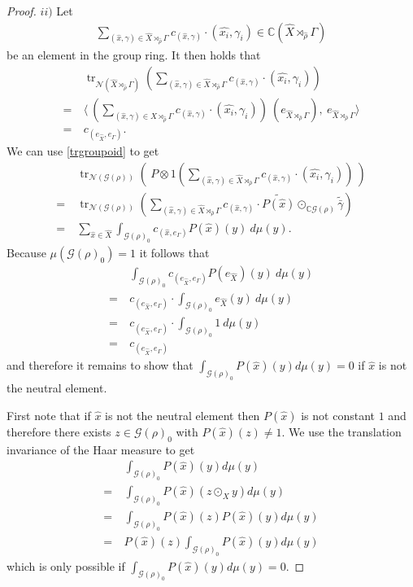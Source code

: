 \documentclass[12pt,a4paper]{scrartcl}
\theoremstyle{plain}
\theoremstyle{definition}
\newcommand{\C}{\mathbb{C}} %
\newcommand{\2}{\mathbb{Z} / 2 \mathbb{Z}}
\newcommand{\G}{\mathcal{G}}
\newcommand{\1}{\bar{1}}
\newcommand{\0}{\bar{0}}
\newcommand{\tr}{\operatorname{tr}}
\begin{document}
\begin{proof}
	$ii)$ Let 
	\begin{align*}
		\sum_{(\hat{x}, \gamma) \in \hat{X} \rtimes_{\hat{\rho}} \Gamma} c_{(\hat{x}, \gamma)} \cdot (\widehat{x_i}, \gamma_i) \in \C(\hat{X} \rtimes_{\hat{\rho}} \Gamma)
	\end{align*}
	be an element in the group ring. It then holds that
	\begin{align*}
		 &~ \tr_{\mathcal{N}(\hat{X} \rtimes_{\hat{\rho}} \Gamma)}(\sum_{(\hat{x}, \gamma) \in \hat{X} \rtimes_{\hat{\rho}} \Gamma} c_{(\hat{x}, \gamma)} \cdot (\widehat{x_i}, \gamma_i)) \\
		=&~ \langle ~(\sum_{(\hat{x}, \gamma) \in \hat{X} \rtimes_{\hat{\rho}} \Gamma} c_{(\hat{x}, \gamma)} \cdot (\widehat{x_i}, \gamma_i))~(e_{\hat{X} \rtimes_{\hat{\rho}} \Gamma}),~ e_{\hat{X} \rtimes_{\hat{\rho}} \Gamma} \rangle \\
		=&~ c_{(e_{\hat{X}}, e_\Gamma)}.
	\end{align*}
	We can use \ref{trgroupoid} to get
	\begin{align*}
		 &~ \tr_{\mathcal{N}(\G(\rho))}(~ P \otimes 1 (\sum_{(\hat{x}, \gamma) \in \hat{X} \rtimes_{\hat{\rho}} \Gamma} c_{(\hat{x}, \gamma)} \cdot (\widehat{x_i}, \gamma_i))~) \\
		=&~ \tr_{\mathcal{N}(\G(\rho))}(\sum_{(\hat{x}, \gamma) \in \hat{X} \rtimes_{\hat{\rho}} \Gamma} c_{(\hat{x}, \gamma)} \cdot \widetilde{P(\hat{x})} \odot_{\C\G(\rho)} \widetilde{\bar{\gamma}}) \\
		=&~ \sum_{\hat{x} \in \hat{X}} \int_{\mathcal{G(\rho)}_0} c_{(\hat{x}, e_\Gamma)} P(\hat{x})(y)~ d\mu(y).
	\end{align*}
	Because $\mu(\G(\rho)_0) = 1$ it follows that
	\begin{align*}
		 &~ \int_{\mathcal{G(\rho)}_0} c_{(e_{\hat{X}}, e_\Gamma)} P(e_{\hat{X}})(y) ~d\mu(y) \\
		=&~ c_{(e_{\hat{X}}, e_\Gamma)} \cdot \int_{\mathcal{G(\rho)}_0}  e_{\hat{X}}(y)~ d\mu(y) \\
		=&~ c_{(e_{\hat{X}}, e_\Gamma)} \cdot \int_{\mathcal{G(\rho)}_0}  1~ d\mu(y) \\
		=&~ c_{(e_{\hat{X}}, e_\Gamma)}
	\end{align*}
	and therefore it remains to show that $\int_{\G(\rho)_0} P(\hat{x})(y) d\mu(y) = 0$ if $\hat{x}$ is not the neutral element.
	
	First note that if $\hat{x}$ is not the neutral element then $P(\hat{x})$ is not constant $1$ and therefore there exists $z \in \G(\rho)_0$ with $P(\hat{x})(z) \neq 1$. We use the translation invariance of the Haar measure to get
	\begin{align*}
		 &~ \int_{\G(\rho)_0} P(\hat{x})(y) d\mu(y) \\
		=&~ \int_{\G(\rho)_0} P(\hat{x})(z \odot_{X} y) d\mu(y) \\
		=&~ \int_{\G(\rho)_0} P(\hat{x})(z) P(\hat{x})(y) d\mu(y) \\
		=&~ P(\hat{x})(z) \int_{\G(\rho)_0} P(\hat{x})(y) d\mu(y)
	\end{align*}
	which is only possible if $\int_{\G(\rho)_0} P(\hat{x})(y) d\mu(y) = 0$.
	

\end{proof}
\end{document}
